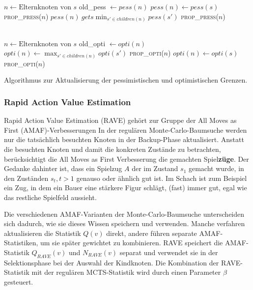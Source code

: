 \begin{algorithm}[H]
\begin{algorithmic}
		\State $n \gets \text{Elternknoten von }s$
		\State old\_pess $\gets pess(n)$
				\State $pess(n) \gets pess(s)$
				\State \textsc{prop\_press}($n$)
			\Else
				\State $pess(n) \ gets \min_{s' \in children(n)}pess(s')$
					\State \textsc{prop\_press}($n$)
				\EndIf
			\EndIf
		\EndIf
	\EndIf
\EndFunction

\\
		\State $n \gets \text{Elternknoten von }s$
		\State old\_opti $\gets opti(n)$
				\State $opti(n) \gets \max_{s' \in children(n)}opti(s')$
					\State \textsc{prop\_opti}($n$)
				\EndIf
			\Else
				\State $opti(n) \gets opti(s)$
				\State \textsc{prop\_opti}($n$)
			\EndIf
		\EndIf
	\EndIf
\EndFunction
\end{algorithmic}
\caption{Algorithmus zur Aktualisierung der pessimistischen und optimistischen Grenzen.\footnotemark}
\label{algo:prop-scorebound}
\end{algorithm}

\subsubsection{Rapid Action Value Estimation}

Rapid Action Value Estimation (RAVE) gehört zur Gruppe der All Moves as First (AMAF)-Verbesserungen
In der regulären Monte-Carlo-Baumsuche werden nur die tatsächlich besuchten Knoten in der Backup-Phase aktualisiert.
Anstatt die besuchten Knoten und damit die konkreten Zustände zu betrachten, berücksichtigt die All Moves as First Verbesserung die gemachten Spiel\textbf{züge}. Der Gedanke dahinter ist, dass ein Spielzug $A$ der im Zustand $s_1$ gemacht wurde, in den Zuständen $s_t, t > 1$ genauso oder ähnlich gut ist. Im Schach ist zum Beispiel ein Zug, in dem ein Bauer eine stärkere Figur schlägt, (fast) immer gut, egal wie das restliche Spielfeld aussieht.\autocite{helmboldAllMovesAsFirstHeuristicsMonteCarlo}

Die verschiedenen AMAF-Varianten der Monte-Carlo-Baumsuche unterscheiden sich dadurch, wie sie dieses Wissen speichern und verwenden. Manche verfahren aktualisieren die Statistik $Q(v)$ direkt, andere führen separate AMAF-Statistiken, um sie später gewichtet zu kombinieren. RAVE speichert die AMAF-Statistik $Q_{RAVE}(v)$ und $N_{RAVE}(v)$ separat und verwendet sie in der Selektionsphase bei der Auswahl der Kindknoten. Die Kombination der RAVE-Statistik mit der regulären MCTS-Statistik wird durch einen Parameter $\beta$ gesteuert.

